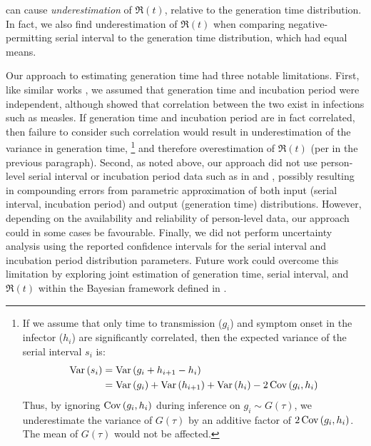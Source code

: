 can cause \emph{underestimation} of $\Re(t)$, relative to the generation time distribution.
In fact, we also find underestimation of $\Re(t)$ when comparing
negative-permitting serial interval to the generation time distribution,
which had equal means.
\par
Our approach to estimating generation time had three notable limitations.
First, like similar works \cite{Kuk2005,Ganyani2020}, we assumed that
generation time and incubation period were independent,
although \textcite{Klinkenberg2011} showed that
correlation between the two exist in infections such as measles.
If generation time and incubation period are in fact correlated,
then failure to consider such correlation would result in
underestimation of the variance in generation time,%
\footnote{If we assume that only
  time to transmission ($g_i$) and symptom onset in the infector ($h_i$)
  are significantly correlated,
  then the expected variance of the serial interval $s_i$ is:
  \begin{align*}
  \mathop{\mathrm{Var}}{\left(s_i\right)}
  &= \mathop{\mathrm{Var}}{\left(g_i + h_{i+1} - h_i\right)}\\
  &= \mathop{\mathrm{Var}}{\left(g_i\right)} + \mathop{\mathrm{Var}}{\left(h_{i+1}\right)} + \mathop{\mathrm{Var}}{\left(h_i\right)}
     - 2 \mathop{\mathrm{Cov}}{\left(g_i,h_i\right)}
  \end{align*}
  Thus, by ignoring $\mathop{\mathrm{Cov}}{\left(g_i,h_i\right)}$ during inference on $g_i \sim G(\tau)$,
  we underestimate the variance of $G(\tau)$ by an additive factor of $2 \mathop{\mathrm{Cov}}{\left(g_i,h_i\right)}$.
  The mean of $G(\tau)$ would not be affected.}
and therefore overestimation of $\Re(t)$
(per \cite{Britton2019} in the previous paragraph).
Second, as noted above, our approach did not use
person-level serial interval or incubation period data
such as in \cite{Ganyani2020} and \cite{Klinkenberg2011},
possibly resulting in compounding errors from
parametric approximation of both input (serial interval, incubation period)
and output (generation time) distributions.
However, depending on the availability and reliability of person-level data,
our approach could in some cases be favourable.
Finally, we did not perform uncertainty analysis using
the reported confidence intervals for
the serial interval and incubation period distribution parameters.
Future work could overcome this limitation by exploring
joint estimation of generation time, serial interval, and $\Re(t)$
within the Bayesian framework defined in \cite{Cori2013}.